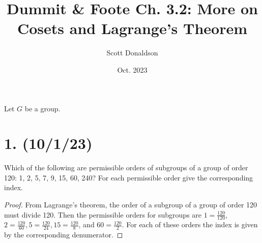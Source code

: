 \documentclass{article}
\title{Dummit \& Foote Ch. 3.2: More on Cosets and Lagrange's Theorem}
\author{Scott Donaldson}
\date{Oct. 2023}
\begin{document}
\maketitle

Let $G$ be a group.

\section*{1. (10/1/23)}

Which of the following are permissible orders of subgroups of a group of order 120: 1, 2, 5, 7, 9, 15, 60, 240? For each permissible order give the corresponding index.

\begin{proof}
    From Lagrange's theorem, the order of a subgroup of a group of order 120 must divide 120. Then the permissible orders for subgroups are $1 = \frac{120}{120}$, $2 = \frac{120}{60}, 5 = \frac{120}{24}, 15 = \frac{120}{8}$, and $60 = \frac{120}{2}$. For each of these orders the index is given by the corresponding denumerator.
\end{proof}
\end{document}
